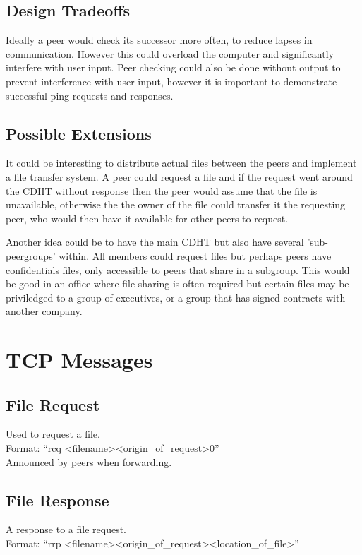 \documentclass[a4paper]{article}
\begin{document}
\subsection{Design Tradeoffs}
Ideally a peer would check its successor more often, to reduce lapses in communication. However this could overload the computer and significantly interfere with user input. Peer checking could also be done without output to prevent interference with user input, however it is important to demonstrate successful ping requests and responses.

\subsection{Possible Extensions}
It could be interesting to distribute actual files between the peers and implement a file transfer system. A peer could request a file and if the request went around the CDHT without response then the peer would assume that the file is unavailable, otherwise the the owner of the file could transfer it the requesting peer, who would then have it available for other peers to request.

Another idea could be to have the main CDHT but also have several 'sub-peergroups' within. All members could request files but perhaps peers have confidentials files, only accessible to peers that share in a subgroup. This would be good in an office where file sharing is often required but certain files may be priviledged to a group of executives, or a group that has signed contracts with another company.

\section{TCP Messages}

\subsection{File Request}
Used to request a file. \\
Format: ``rcq \textless filename\textgreater  \textless origin\_of\_request\textgreater  0''\\

Announced by peers when forwarding.

\subsection{File Response}
A response to a file request. \\
Format: ``rrp \textless filename\textgreater  \textless origin\_of\_request\textgreater  \textless location\_of\_file\textgreater '' \\
\end{document}
